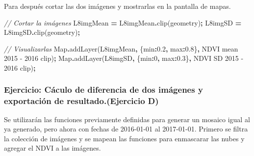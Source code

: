 \documentclass[
  12pt,
  letterpaper,
  twoside]{book}
\newenvironment{Shaded}{\begin{snugshade}}{\end{snugshade}}
\newcommand{\BuiltInTok}[1]{#1}
\newcommand{\CommentTok}[1]{\textcolor[rgb]{0.56,0.35,0.01}{\textit{#1}}}
\newcommand{\DataTypeTok}[1]{\textcolor[rgb]{0.13,0.29,0.53}{#1}}
\newcommand{\DecValTok}[1]{\textcolor[rgb]{0.00,0.00,0.81}{#1}}
\newcommand{\FloatTok}[1]{\textcolor[rgb]{0.00,0.00,0.81}{#1}}
\newcommand{\FunctionTok}[1]{\textcolor[rgb]{0.00,0.00,0.00}{#1}}
\newcommand{\NormalTok}[1]{#1}
\newcommand{\OperatorTok}[1]{\textcolor[rgb]{0.81,0.36,0.00}{\textbf{#1}}}
\newcommand{\StringTok}[1]{\textcolor[rgb]{0.31,0.60,0.02}{#1}}
\begin{document}
Para después cortar las dos imágenes y mostrarlas en la pantalla de mapas.

\begin{Shaded}
\begin{Highlighting}[]
\CommentTok{// Cortar la imágenes}
\NormalTok{L8imgMean }\OperatorTok{=}\NormalTok{ L8imgMean}\OperatorTok{.}\FunctionTok{clip}\NormalTok{(geometry)}\OperatorTok{;}
\NormalTok{L8imgSD }\OperatorTok{=}\NormalTok{ L8imgSD}\OperatorTok{.}\FunctionTok{clip}\NormalTok{(geometry)}\OperatorTok{;}

\CommentTok{// Visualizarlas}
\BuiltInTok{Map}\OperatorTok{.}\FunctionTok{addLayer}\NormalTok{(L8imgMean}\OperatorTok{,}\NormalTok{ \{}\DataTypeTok{min}\OperatorTok{:}\FloatTok{0.2}\OperatorTok{,} \DataTypeTok{max}\OperatorTok{:}\FloatTok{0.8}\NormalTok{\}}\OperatorTok{,} \StringTok{\textquotesingle{}NDVI mean 2015 {-} 2016 clip\textquotesingle{}}\NormalTok{)}\OperatorTok{;}
\BuiltInTok{Map}\OperatorTok{.}\FunctionTok{addLayer}\NormalTok{(L8imgSD}\OperatorTok{,}\NormalTok{ \{}\DataTypeTok{min}\OperatorTok{:}\DecValTok{0}\OperatorTok{,} \DataTypeTok{max}\OperatorTok{:}\FloatTok{0.3}\NormalTok{\}}\OperatorTok{,} \StringTok{\textquotesingle{}NDVI SD 2015 {-} 2016 clip\textquotesingle{}}\NormalTok{)}\OperatorTok{;}
\end{Highlighting}
\end{Shaded}

\hypertarget{ejercicio-cuxe1culo-de-diferencia-de-dos-imuxe1genes-y-exportaciuxf3n-de-resultado.ejercicio-d}{%
\subsubsection*{Ejercicio: Cáculo de diferencia de dos imágenes y exportación de resultado.(Ejercicio D)}\label{ejercicio-cuxe1culo-de-diferencia-de-dos-imuxe1genes-y-exportaciuxf3n-de-resultado.ejercicio-d}}

Se utilizarán las funciones previamente definidas para generar un mosaico igual al ya generado, pero ahora con fechas de 2016-01-01 al 2017-01-01. Primero se filtra la colección de imágenes y se mapean las funciones para enmascarar las nubes y agregar el NDVI a las imágenes.
\end{document}
